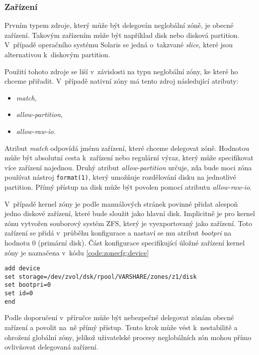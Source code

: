 \subsubsection{Zařízení}
\label{chapter:zones:configuration:resources:device}
Prvním typem zdroje, který může být delegován neglobální zóně, je obecné zařízení. Takovým zařízením může být například disk
nebo disková partition. V~případě operačního systému Solaris se jedná o~takzvané \textit{slice}, které jsou alternativou k~diskovým 
partition. 

Použití tohoto zdroje se liší v~závislosti na typu neglobální zóny, ke které ho chceme přiřadit. V~případě nativní zóny má tento
zdroj následující  atributy:
\begin{itemize}
 \item \textit{match},
 \item \textit{allow-partition},
 \item \textit{allow-raw-io}.
\end{itemize}
Atribut \textit{match} odpovídá jménu zařízení, které chceme delegovat zóně. Hodnotou může být absolutní cesta k~zařízení nebo
regulární výraz, který může specifikovat více zařízení najednou. Druhý atribut \textit{allow-partition} určuje, zda 
bude moci zóna používat nástroj \verb|format(1)|, který umožňuje rozdělování disku na jednotlivé partition. Přímý přístup na disk
může být povolen pomocí atributu \textit{allow-raw-io}.

V~případě kernel zóny je podle manuálových stránek \cite{oracle:manpages:solaris-kz} povinné přidat alespoň jedno diskové zařízení,
které bude sloužit jako hlavní disk. Implicitně je pro kernel zónu vytvořen souborový systém ZFS, který je vyexportovaný jako
zařízení. Toto zařízení se přidá v~průběhu konfigurace a nastaví se mu atribut \textit{bootpri} na hodnotu 0 (primární disk).
Část konfigurace specifikující úložné zařízení kernel zóny je naznačena v~kódu \ref{code:zonecfg:device}
\begin{lstlisting}[caption={Konfigurace zařízení kernel zóny}, float, label={code:zonecfg:device}]
add device
set storage=/dev/zvol/dsk/rpool/VARSHARE/zones/z1/disk
set bootpri=0
set id=0
end
\end{lstlisting}
Podle doporučení v~příručce \cite{oracle:manpages:zonecfg} může být nebezpečné delegovat zónám obecné zařízení a povolit na~ně přímý
přístup. Tento krok může vést k~nestabilitě a ohrožení globální zóny, jelikož uživatelské procesy neglobálních zón mohou
přímo ovlivňovat delegovaná zařízení.
